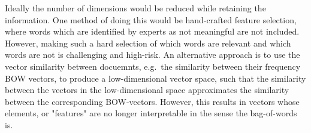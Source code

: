 Ideally the number of dimensions would be reduced while retaining the information. One method of doing this would be hand-crafted feature selection, where words which are identified by experts as not meaningful are not included. However, making such a hard selection of which words are relevant and which words are not is challenging and high-risk. An alternative approach is to use the vector similarity between docuemnts, e.g.\ the similarity between their frequency BOW vectors, to produce a low-dimensional vector space, such that the similarity between the vectors in the low-dimensional space approximates the similarity between the corresponding BOW-vectors. However, this results in vectors whose elements, or "features" are no longer interpretable in the sense the bag-of-words is.






